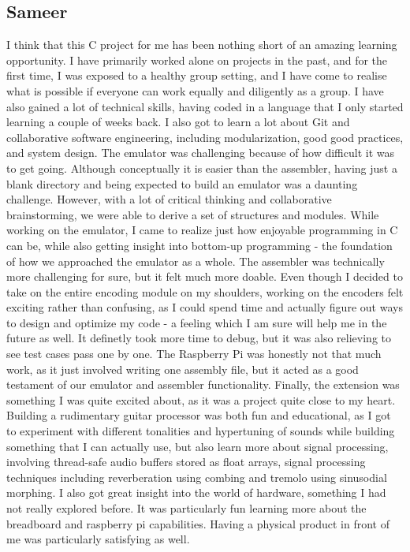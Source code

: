 \documentclass{article}
\begin{document}
\subsection{Sameer}

I think that this C project for me has been nothing short of an amazing learning opportunity. I have primarily worked alone on projects in the past, and for the first time, I was exposed to a healthy group setting, and I have come to realise what is possible if everyone can work equally and diligently as a group. I have also gained a lot of technical skills, having coded in a language that I only started learning a couple of weeks back. I also got to learn a lot about Git and collaborative software engineering, including modularization, good good practices, and system design. The emulator was challenging because of how difficult it was to get going. Although conceptually it is easier than the assembler, having just a blank directory and being expected to build an emulator was a daunting challenge. However, with a lot of critical thinking and collaborative brainstorming, we were able to derive a set of structures and modules. While working on the emulator, I came to realize just how enjoyable programming in C can be, while also getting insight into bottom-up programming - the foundation of how we approached the emulator as a whole. The assembler was technically more challenging for sure, but it felt much more doable. Even though I decided to take on the entire encoding module on my shoulders, working on the encoders felt exciting rather than confusing, as I could spend time and actually figure out ways to design and optimize my code - a feeling which I am sure will help me in the future as well. It definetly took more time to debug, but it was also relieving to see test cases pass one by one. The Raspberry Pi was honestly not that much work, as it just involved writing one assembly file, but it acted as a good testament of our emulator and assembler functionality. Finally, the extension was something I was quite excited about, as it was a project quite close to my heart. Building a rudimentary guitar processor was both fun and educational, as I got to experiment with different tonalities and hypertuning of sounds while building something that I can actually use, but also learn more about signal processing, involving thread-safe audio buffers stored as float arrays, signal processing techniques including reverberation using combing and tremolo using sinusodial morphing. I also got great insight into the world of hardware, something I had not really explored before. It was particularly fun learning more about the breadboard and raspberry pi capabilities. Having a physical product in front of me was particularly satisfying as well. 
\end{document}
